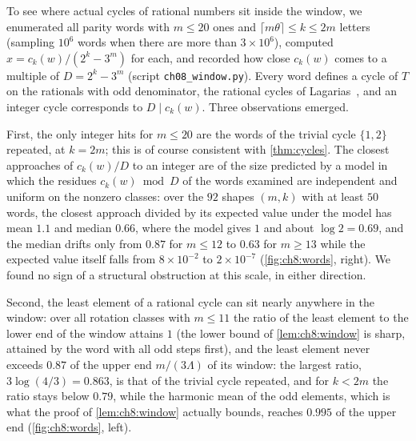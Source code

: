 To see where actual cycles of rational numbers sit inside the window, we
enumerated all parity words with $m\le20$ ones and
$\lceil m\theta\rceil\le k\le2m$ letters (sampling $10^6$ words when there are
more than $3\times10^6$), computed $x=c_k(w)/(2^k-3^m)$ for each, and recorded
how close $c_k(w)$ comes to a multiple of $D=2^k-3^m$ (script
\texttt{ch08\_window.py}). Every word defines a cycle of $T$ on the rationals
with odd denominator, the rational cycles of Lagarias~\cite{lagarias1990}, and
an integer cycle corresponds to $D\mid c_k(w)$. Three observations emerged.

First, the only integer hits for $m\le20$ are the words of the trivial cycle
$\{1,2\}$ repeated, at $k=2m$; this is of course consistent with
\cref{thm:cycles}.
The closest approaches of $c_k(w)/D$ to an integer are of the size predicted by a model in which the residues $c_k(w)\bmod D$ of the words examined are independent and uniform on the nonzero classes: over the $92$ shapes $(m,k)$ with at least $50$ words, the closest approach divided by its expected value under the model has mean $1.1$ and median $0.66$, where the model gives $1$ and about $\log2=0.69$, and the median drifts only from $0.87$ for $m\le12$ to $0.63$ for $m\ge13$ while the expected value itself falls from $8\times10^{-2}$ to $2\times10^{-7}$ (\cref{fig:ch8:words}, right).
We found no sign of a structural obstruction at
this scale, in either direction.

Second, the least element of a rational cycle can sit nearly anywhere in the window:
over all rotation classes with $m\le11$ the ratio of the least element to the
lower end of the window attains $1$ (the lower bound of
\cref{lem:ch8:window} is sharp, attained by the word with all odd steps
first), and the least element never exceeds $0.87$ of the upper end $m/(3\Lambda)$ of its window: the largest ratio, $3\log(4/3)=0.863$, is that of the trivial cycle repeated, and for $k<2m$ the ratio stays below $0.79$, while the harmonic mean of the odd elements, which is what the proof of \cref{lem:ch8:window} actually bounds, reaches $0.995$ of the upper end
(\cref{fig:ch8:words}, left).

